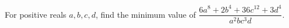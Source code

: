 For positive reals $a,b,c,d$, find the minimum value of $\dfrac{6a^8+2b^4+36c^{12}+3d^4}{a^2bc^3d}$.
